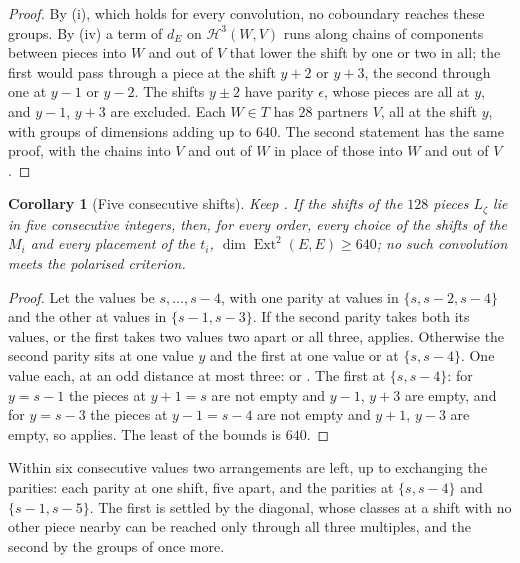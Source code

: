 \documentclass[11pt,reqno]{amsart}
\theoremstyle{plain}
\newtheorem{corollary}[theorem]{Corollary}
\theoremstyle{definition}
\theoremstyle{remark}
\newcommand{\cH}{\mathcal{H}}
\DeclareMathOperator{\Ext}{Ext}
\begin{document}
\begin{proof}
By (i), which holds for every convolution, no
coboundary reaches these groups. By (iv) a term of
$d_{E}$ on $\cH^{3}(W,V)$ runs along chains of components between pieces
into $W$ and out of $V$ that lower the shift by one or two in all; the
first would pass through a piece at the shift $y+2$ or $y+3$, the second
through one at $y-1$ or $y-2$. The shifts $y\pm2$ have parity $\epsilon$,
whose pieces are all at $y$, and $y-1$, $y+3$ are excluded. Each $W\in T$
has $28$ partners $V$, all at the shift $y$, with groups of dimensions adding
up to $640$. The second statement has the same proof, with the chains into
$V$ and out of $W$ in place of those into $W$ and out of $V$.
\end{proof}

\begin{corollary}[Five consecutive shifts]\label{cor:efourfive}
Keep . If the shifts of the $128$ pieces $L_{\zeta}$
lie in five consecutive integers, then, for every order, every choice of the
shifts of the $M_{i}$ and every placement of the $t_{i}$,
$\dim\Ext^{2}(E,E)\ge640$; no such convolution meets the polarised
criterion.
\end{corollary}

\begin{proof}
Let the values be $s,\dots,s-4$, with one parity at values in
$\{s,s-2,s-4\}$ and the other at values in $\{s-1,s-3\}$. If the second
parity takes both its values, or the first takes two values two apart or all
three,  applies. Otherwise the second parity sits at
one value $y$ and the first at one value or at $\{s,s-4\}$. One value each,
at an odd distance at most three:  or
. The first at $\{s,s-4\}$: for $y=s-1$ the
pieces at $y+1=s$ are not empty and $y-1$, $y+3$ are empty, and for $y=s-3$
the pieces at $y-1=s-4$ are not empty and $y+1$, $y-3$ are empty, so
 applies. The least of the bounds is $640$.
\end{proof}

Within six consecutive values two arrangements are left, up to exchanging
the parities: each parity at one shift, five apart, and the parities at
$\{s,s-4\}$ and $\{s-1,s-5\}$. The first is settled by the diagonal, whose
classes at a shift with no other piece nearby can be reached only through
all three multiples, and the second by the groups of
 once more.
\end{document}
